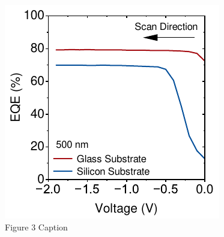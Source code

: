 \begin{figure}[h!]
    \vspace{1em} %
    \begin{minipage}{0.48\textwidth}
        \centering
        \includegraphics[width=\textwidth]{chapters/material_properties/images/EQE_fV_PIX_Glass.pdf} %
        \caption{Figure 3 Caption}
        \label{fig:ch2:eqefV_comp_pix_glass}
    \end{minipage}
\end{figure}







